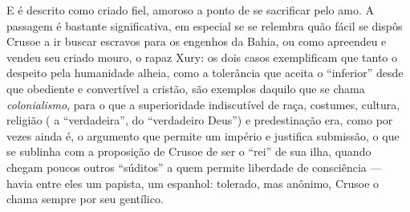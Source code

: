 E é descrito como criado fiel, amoroso a ponto de se sacrificar pelo
amo. A passagem é bastante significativa, em especial se se relembra
quão fácil se dispôs Crusoe a ir buscar escravos para os engenhos da
Bahia, ou como apreendeu e vendeu seu criado mouro, o rapaz Xury: os
dois casos exemplificam que tanto o despeito pela humanidade alheia,
como a tolerância que aceita o ``inferior'' desde que obediente e
convertível a cristão, são exemplos daquilo que se chama
\emph{colonialismo}, para o que a superioridade indiscutível de raça,
costumes, cultura, religião ( a ``verdadeira'', do ``verdadeiro Deus'')
e predestinação era, como por vezes ainda é, o argumento que permite um
império e justifica submissão, o que se sublinha com a proposição de
Crusoe de ser o ``rei'' de sua ilha, quando chegam poucos outros
``súditos'' a quem permite liberdade de consciência --- havia entre eles
um papista, um espanhol: tolerado, mas anônimo, Crusoe o chama sempre
por seu gentílico.

%

